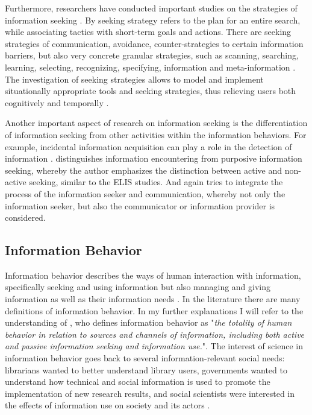 \documentclass[12pt, a4paper, titlepage, oneside, abstract=true, toc=listof, toc=bibliography, BCOR=1cm]{scrreprt}
\begin{document}
Furthermore, researchers have conducted important studies on the strategies of information seeking \citep[e.g.][]{Belkin1993, Belkin1995, Jordan2016, Kriewel2010, McKenzie2002, Mehra2013}. By seeking strategy \citet{Bates1979} refers to the plan for an entire search, while associating tactics with short-term goals and actions. There are seeking strategies of communication, avoidance, counter-strategies to certain information barriers, but also very concrete granular strategies, such as scanning, searching, learning, selecting, recognizing, specifying, information and meta-information \citep{Belkin1993, Belkin1995}. The investigation of seeking strategies allows to model and implement situationally appropriate tools and seeking strategies, thus relieving users both cognitively and temporally \citep{Kriewel2010}.

Another important aspect of research on information seeking is the differentiation of information seeking from other activities within the information behaviors. For example, incidental information acquisition can play a role in the detection of information \citep{Williamson1998}. \citet{Palsdottir2010} distinguishes information encountering from purposive information seeking, whereby the author emphasizes the distinction between active and non-active seeking, similar to the ELIS studies. And again \citet{Robson2013} tries to integrate the process of the information seeker and communication, whereby not only the information seeker, but also the communicator or information provider is considered.
	
\subsection{Information Behavior}
\label{sec:IB}
Information behavior describes the ways of human interaction with information, specifically seeking and using information \citep[p. 2381]{Bates2010} but also managing and giving information as well as their information needs \citep[p. 1]{Fisher2009}. In the literature there are many definitions of information behavior. In my further explanations I will refer to the understanding of \citet[p. 49]{Wilson2000}, who defines information behavior as "\textit{the totality of human behavior in relation to sources and channels of information, including both active and passive information seeking and information use.}". The interest of science in information behavior goes back to several information-relevant social needs: librarians wanted to better understand library users, governments wanted to understand how technical and social information is used to promote the implementation of new research results, and social scientists were interested in the effects of information use on society and its actors \citep[p. 2381]{Bates2010}. 
\end{document}
